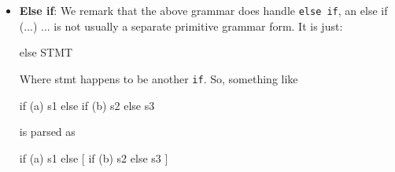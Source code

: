 \documentclass{report}
\begin{document}
\begin{itemize}
\begin{align*}
                D &\to F == F \mid F \ne F \mid E\\
                E &\to F < F \mid F \leq F \mid F > F \mid F \geq F \mid F \\
                F &\to F + G \mid F - G \mid G\\
                G &\to G * H \mid G / H \mid G \text{ mod } H \mid H\\
                H &\to \neg I \mid \oplus I \mid I\\
                I &\to I \land J \mid J\\
                J &\to (A) \mid \text{int} \mid \text{ true } \mid \text{ false } \mid \text{ ident }
            ,\end{align*}
            which produces the following syntax diagrams.
            \bigbreak \noindent 
            \begin{minipage}[ht]{0.55\textwidth}
            \end{minipage}
            \begin{minipage}[ht]{0.47\textwidth}
            \end{minipage}
            \bigbreak \noindent 
            \begin{minipage}[ht]{0.25\textwidth}
            \end{minipage}
            \begin{minipage}[ht]{0.47\textwidth} \end{minipage}
        \item \textbf{Else if}: We remark that the above grammar does handle \texttt{else if}, an else if (...) ... is not usually a separate primitive grammar form. It is just:
            \bigbreak \noindent 
            \begin{cppcode}
            else STMT
            \end{cppcode}
            \bigbreak \noindent 
            Where stmt happens to be another \texttt{if}. So, something like 
            \bigbreak \noindent 
            \begin{cppcode}
            if (a) s1 else if (b) s2 else s3
            \end{cppcode}
            \bigbreak \noindent 
            is parsed as
            \bigbreak \noindent 
            \begin{cppcode}
            if (a) s1 else [ if (b) s2 else s3 ]
            \end{cppcode}

\end{itemize}
\end{document}
